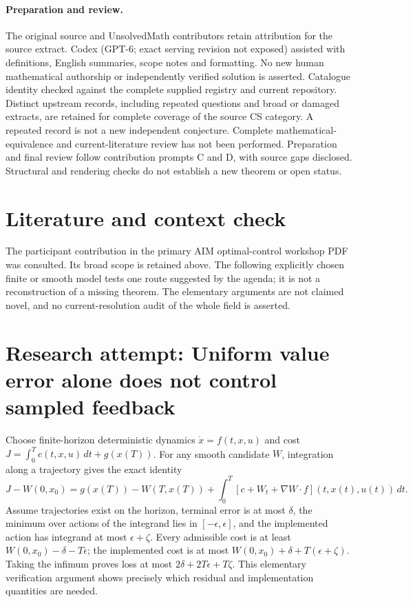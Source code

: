 \documentclass[11pt]{article}
\begin{document}
\paragraph{Preparation and review.}
The original source and UnsolvedMath contributors retain attribution for the source extract. Codex (GPT-6; exact serving revision not exposed) assisted with definitions, English summaries, scope notes and formatting. No new human mathematical authorship or independently verified solution is asserted. Catalogue identity checked against the complete supplied registry and current repository. Distinct upstream records, including repeated questions and broad or damaged extracts, are retained for complete coverage of the source CS category. A repeated record is not a new independent conjecture. Complete mathematical-equivalence and current-literature review has not been performed. Preparation and final review follow contribution prompts C and D, with source gaps disclosed. Structural and rendering checks do not establish a new theorem or open status.
\label{end:statement}

\section{Literature and context check}
The participant contribution in the primary AIM optimal-control workshop
 PDF was consulted. Its broad scope is retained above. The following explicitly
 chosen finite or smooth model tests one route suggested by the agenda; it is
 not a reconstruction of a missing theorem. The elementary arguments are not
 claimed novel, and no current-resolution audit of the whole field is asserted.
\section{Research attempt: Uniform value error alone does not control sampled feedback}
Choose finite-horizon deterministic dynamics $\dot x=f(t,x,u)$ and cost
$J=\int_0^T c(t,x,u)\,dt+g(x(T))$. For any smooth candidate $W$, integration
along a trajectory gives the exact identity
\[
 J-W(0,x_0)=g(x(T))-W(T,x(T))+
 \int_0^T[c+W_t+\nabla W\cdot f](t,x(t),u(t))\,dt.
\]
Assume trajectories exist on the horizon, terminal error is at most $\delta$,
the minimum over actions of the integrand lies in $[-\epsilon,\epsilon]$,
and the implemented action has integrand at most $\epsilon+\zeta$.
Every admissible cost is at least $W(0,x_0)-\delta-T\epsilon$; the implemented
cost is at most $W(0,x_0)+\delta+T(\epsilon+\zeta)$. Taking the infimum
proves loss at most $2\delta+2T\epsilon+T\zeta$. This elementary verification
argument shows precisely which residual and implementation quantities are needed.
\end{document}

